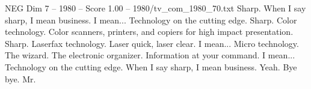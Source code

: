 \begin{textsample}{NEG Dim 7 – 1980 – Score 1.00 – 1980/tv\_com\_1980\_70.txt}  \label{ex:f7_neg_052}
Sharp.
When I say sharp, I mean business.
I mean...
Technology on the cutting edge.
Sharp.
Color technology.
Color scanners, printers, and copiers for high impact presentation.
Sharp.
Laserfax technology.
Laser quick, laser clear.
I mean...
Micro technology.
The wizard.
The electronic organizer.
Information at your command.
I mean...
Technology on the cutting edge.
When I say sharp, I mean business.
Yeah.
Bye bye.
Mr.

\end{textsample}
